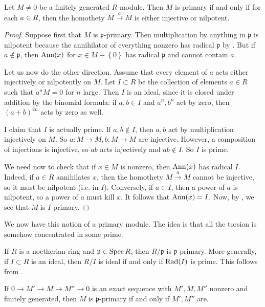 \begin{proposition} \label{whenisprimary2}
Let $M \neq 0$ be a finitely generated $R$-module. Then $M$ is primary if and
only if for each $a \in
R$, then the homothety $ M \stackrel{a}{\to} M$ is either injective or nilpotent.
\end{proposition}
\begin{proof} 
Suppose first that $M$ is $\mathfrak{p}$-primary. Then multiplication by anything in
$\mathfrak{p}$ is nilpotent because the annihilator of everything nonzero has
radical $\mathfrak{p}$ by . But if $a \notin \mathfrak{p}$, then $\operatorname{Ann}(x)$ for
$x \in M - \left\{0\right\}$ has radical $\mathfrak{p}$ and cannot contain $a$. 

Let us now do the other direction. Assume that every element of $a$ acts either injectively or nilpotently on $M$.
Let $I \subset R$ be the collection of elements $a \in R$ such that $a^n M = 0$
for $n$ large. Then $I$ is an ideal, since it is closed under addition by the
binomial formula: if $a, b \in I$ and $a^n, b^n$ act by zero, then $(a+b)^{2n}$
acts by zero as well.


I claim that $I$ is actually prime. If $a,b \notin I$, then  $a,b$ act by
multiplication injectively on $M$. So $a: M \to M, b: M \to M$ are injective.
However, a composition of injections is injective, so $ab$ acts injectively and
$ab \notin I$. So $I$ is prime.

We need now to check that if $x \in M$ is nonzero, then $\operatorname{Ann}(x)$ has radical
$I$. Indeed, if $a \in R$   annihilates $x$,
then the homothety  $M \stackrel{a}{\to} M$ cannot be injective, so it must be
nilpotent (i.e. in $I$). Conversely, if $a \in I$, then a power of $a$ is
nilpotent, so a power of $a$ 
must kill $x$. 
It follows that $\operatorname{Ann}(x) = I$. Now, by , we see
that $M$ is $I$-primary.
\end{proof} 

We now have this notion of a primary module. The idea is that all the torsion is
somehow concentrated in some prime.

\begin{example} 
If $R$ is a noetherian ring and $\mathfrak{p} \in \operatorname{Spec} R$, then
$R/\mathfrak{p}$ is $\mathfrak{p}$-primary. More generally, if $I \subset R$
is an ideal, then $R/I$ is ideal if and only if $\operatorname{Rad}(I) $ is prime. This
follows from .
\end{example} 

\begin{exercise} 
If $0 \to M' \to M \to M'' \to 0$ is an exact sequence with $M', M, M''$
nonzero and finitely generated, then $M$ is $\mathfrak{p}$-primary if and only if $M', M''$ are.
\end{exercise} 


